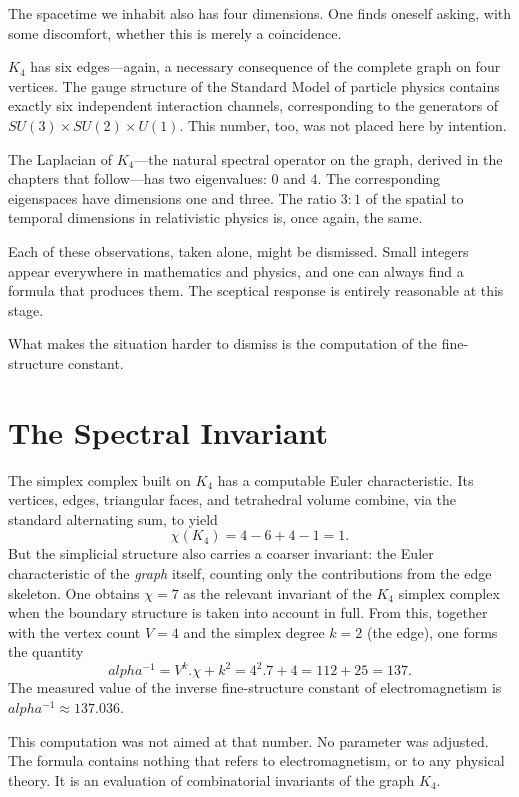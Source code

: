\documentclass[11pt,a4paper]{book}
\def\alpha{alpha}%
\def\cdot{.}%
\begin{document}
The spacetime we inhabit also has four dimensions. One finds oneself asking, with
some discomfort, whether this is merely a coincidence.

$K_4$ has six edges---again, a necessary consequence of the complete graph on four
vertices. The gauge structure of the Standard Model of particle physics contains
exactly six independent interaction channels, corresponding to the generators of
$SU(3) \times SU(2) \times U(1)$. This number, too, was not placed here by intention.

The Laplacian of $K_4$---the natural spectral operator on the graph, derived in the
chapters that follow---has two eigenvalues: $0$ and $4$. The corresponding
eigenspaces have dimensions one and three. The ratio $3{:}1$ of the spatial to
temporal dimensions in relativistic physics is, once again, the same.

Each of these observations, taken alone, might be dismissed. Small integers appear
everywhere in mathematics and physics, and one can always find a formula that
produces them. The sceptical response is entirely reasonable at this stage.

What makes the situation harder to dismiss is the computation of the fine-structure
constant.

\section{The Spectral Invariant}

The simplex complex built on $K_4$ has a computable Euler characteristic. Its
vertices, edges, triangular faces, and tetrahedral volume combine, via the
standard alternating sum, to yield
\[
  \chi(K_4) = 4 - 6 + 4 - 1 = 1.
\]
But the simplicial structure also carries a coarser invariant: the Euler
characteristic of the \emph{graph} itself, counting only the contributions from
the edge skeleton. One obtains $\chi = 7$ as the relevant invariant of the
$K_4$ simplex complex when the boundary structure is taken into account in full.
From this, together with the vertex count $V = 4$ and the simplex degree $k = 2$
(the edge), one forms the quantity
\[
  \alpha^{-1} = V^k \cdot \chi + k^2 = 4^2 \cdot 7 + 4 = 112 + 25 = 137.
\]
The measured value of the inverse fine-structure constant of electromagnetism
is $\alpha^{-1} \approx 137.036$.

This computation was not aimed at that number. No parameter was adjusted. The
formula contains nothing that refers to electromagnetism, or to any physical
theory. It is an evaluation of combinatorial invariants of the graph $K_4$.
\end{document}

